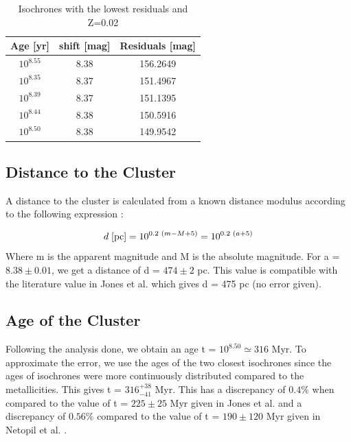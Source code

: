 \documentclass[12pt]{article}
\begin{document}
\begin{table}[H]
    \centering
    \begin{tabular}{c|c|c}
          \hline
          \hline
         Age [yr] & shift [mag] & Residuals [mag]  \\
         \hline
         $10^{8.55}$&8.38 &156.2649 \\
         $10^{8.35}$&8.37 &151.4967 \\
         $10^{8.39}$&8.37 &151.1395 \\
         $10^{8.44}$&8.38 &150.5916 \\
         $10^{8.50}$&8.38 &149.9542 \\
         \hline
    \end{tabular}
    \caption{Isochrones with the lowest residuals and Z=0.02}
    \label{tab1}
\end{table}

\subsection{Distance to the Cluster}
A distance to the cluster is calculated from a known distance modulus according to the following expression \cite{lecturenote}:

\begin{equation}
d \hspace{0.1cm} [\mathrm{pc}]=10^{0.2 \hspace{0.1cm} (m-M+5)} =10^{0.2 \hspace{0.1cm} (a+5)} 
\end{equation}
Where m is the apparent magnitude and M is the absolute magnitude. 
For a = $8.38 \pm 0.01$, we get a distance of d = $474 \pm 2 $ pc. This value is compatible with the literature value in Jones et al. \cite{jones} which gives d = 475 pc (no error given). 
\subsection{Age of the Cluster}
Following the analysis done, we obtain an age t = $10^{8.50} \simeq 316$ Myr. To approximate the error, we use the ages of the two closest isochrones since the ages of isochrones were more continuously distributed compared to the metallicities. This gives  t = $316^{+38}_{-41}$ Myr. This has a discrepancy of $0.4\%$ when compared to the value of t = $225 \pm 25$ Myr given in Jones et al. \cite{jones} and a discrepancy of $0.56\%$ compared to the value of t = $190 \pm 120$ Myr given in Netopil et al. \cite{netopil}. 
\end{document}
